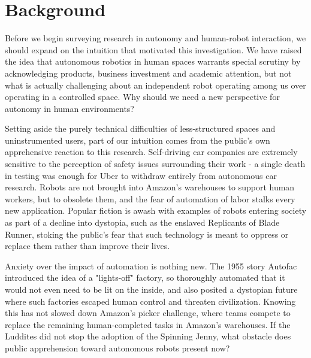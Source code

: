 \documentclass{sfuthesis}
\begin{document}
\section{Background}


Before we begin surveying research in autonomy and human-robot interaction, we should expand on the intuition that motivated this investigation. We have raised the idea that autonomous robotics in human spaces warrants special scrutiny by acknowledging products, business investment and academic attention, but not what is actually challenging about an independent robot operating among us over operating in a controlled space. Why should we need a new perspective for autonomy in human environments?

Setting aside the purely technical difficulties of less-structured spaces and uninstrumented users, part of our intuition comes from the public's own apprehensive reaction to this research. Self-driving car companies are extremely sensitive to the perception of safety issues surrounding their work - a single death in testing was enough for Uber to withdraw entirely from autonomous car research. Robots are not brought into Amazon's warehouses to support human workers, but to obsolete them, and the fear of automation of labor stalks every new application. Popular fiction is awash with examples of robots entering society as part of a decline into dystopia, such as the enslaved Replicants of Blade Runner, stoking the public's fear that such technology is meant to oppress or replace them rather than improve their lives.





Anxiety over the impact of automation is nothing new. The 1955 story Autofac introduced the idea of a "lights-off" factory, so thoroughly automated that it would not even need to be lit on the inside, and also posited a dystopian future where such factories escaped human control and threaten civilization. Knowing this has not slowed down Amazon's picker challenge, where teams compete to replace the remaining human-completed tasks in Amazon's warehouses. If the Luddites did not stop the adoption of the Spinning Jenny, what obstacle does public apprehension toward autonomous robots present now?
\end{document}
